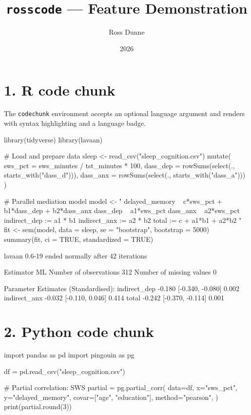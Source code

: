 \documentclass[11pt, a4paper]{article}
\title{\texttt{rosscode} --- Feature Demonstration}
\author{Ross Dunne}
\date{2026}
\begin{document}
\maketitle

\section*{1. R code chunk}

The \texttt{codechunk} environment accepts an optional language argument
and renders with syntax highlighting and a language badge.

\begin{codechunk}[R]
library(tidyverse)
library(lavaan)

# Load and prepare data
sleep <- read_csv("sleep_cognition.csv") %
  mutate(
    sws_pct  = sws_minutes / tst_minutes * 100,
    dass_dep = rowSums(select(., starts_with("dass_d"))),
    dass_anx = rowSums(select(., starts_with("dass_a")))
  )

# Parallel mediation model
model <- "
  delayed_memory ~ c*sws_pct + b1*dass_dep + b2*dass_anx
  dass_dep       ~ a1*sws_pct
  dass_anx       ~ a2*sws_pct
  indirect_dep := a1 * b1
  indirect_anx := a2 * b2
  total          := c + a1*b1 + a2*b2
"
fit <- sem(model, data = sleep, se = "bootstrap", bootstrap = 5000)
summary(fit, ci = TRUE, standardized = TRUE)
\end{codechunk}

\begin{codeoutput}
lavaan 0.6-19 ended normally after 42 iterations

  Estimator                                         ML
  Number of observations                           312
  Number of missing values                           0

Parameter Estimates (Standardised):
  indirect_dep    -0.180   [-0.340, -0.080]    0.002
  indirect_anx    -0.032   [-0.110,  0.046]    0.414
  total           -0.242   [-0.370, -0.114]    0.001
\end{codeoutput}

\section*{2. Python code chunk}

\begin{codechunk}[Python]
import pandas as pd
import pingouin as pg

df = pd.read_csv("sleep_cognition.csv")

# Partial correlation: SWS%
partial = pg.partial_corr(
    data=df,
    x="sws_pct",
    y="delayed_memory",
    covar=["age", "education"],
    method="pearson",
)
print(partial.round(3))
\end{codechunk}
\end{document}
